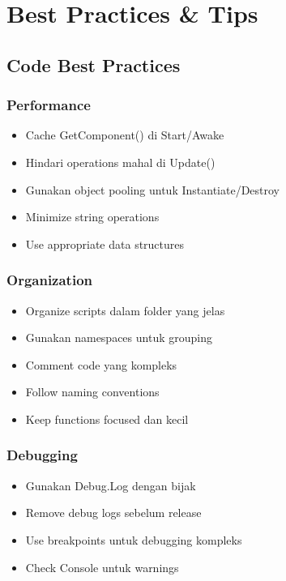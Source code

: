 
\chapter{Best Practices \& Tips}

\section{Code Best Practices}

\subsection{Performance}

\begin{itemize}
\item Cache GetComponent() di Start/Awake
\item Hindari operations mahal di Update()
\item Gunakan object pooling untuk Instantiate/Destroy
\item Minimize string operations
\item Use appropriate data structures
\end{itemize}

\subsection{Organization}

\begin{itemize}
\item Organize scripts dalam folder yang jelas
\item Gunakan namespaces untuk grouping
\item Comment code yang kompleks
\item Follow naming conventions
\item Keep functions focused dan kecil
\end{itemize}

\subsection{Debugging}

\begin{itemize}
\item Gunakan Debug.Log dengan bijak
\item Remove debug logs sebelum release
\item Use breakpoints untuk debugging kompleks
\item Check Console untuk warnings
\end{itemize}

